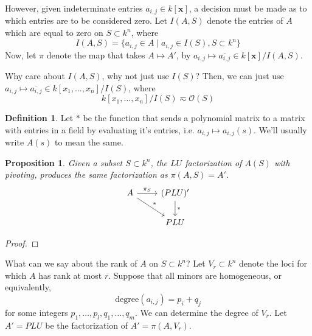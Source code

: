 \documentclass{amsart}
\newtheorem{proposition}[theorem]{Proposition}
\theoremstyle{definition}
\newtheorem{definition}[theorem]{Definition}
\theoremstyle{remark}
\numberwithin{equation}{section}
\begin{document}
However, given indeterminate entries $a_{i,j} \in k[\mathbf{x}]$, a decision must be made as to which entries are to be considered zero. Let $I(A, S)$ denote the entries of $A$ which are equal to zero on $S \subset k^n$, where
\begin{equation*}
  I(A, S) = \{ a_{i,j} \in A \mid a_{i,j} \in I(S), S \subset k^n \}
\end{equation*}
Now, let $\pi$ denote the map that takes $A \mapsto A'$, by $a_{i,j} \mapsto \overline{a_{i,j}} \in k[\mathbf{x}]/I(A, S)$.
\begin{aroundtodo}[caption={}]
  Why care about $I(A, S)$, why not just use $I(S)$? Then, we can just use $a_{i,j} \mapsto \overline{a_{i,j}} \in k[x_1, \ldots, x_n]/I(S)$, where
  \begin{equation*}
    k[x_1, \ldots, x_n]/I(S) \eqsim \mathcal{O}(S)
  \end{equation*}
\end{aroundtodo}

\begin{definition}
  Let $*$ be the function that sends a polynomial matrix to a matrix with entries in a field by evaluating it's entries, i.e. $a_{i,j} \mapsto a_{i,j}(s)$. We'll usually write $A(s)$ to mean the same.
\end{definition}

\begin{proposition}
  Given a subset $S \subset k^n$, the $LU$ factorization of $A(S)$ with pivoting, produces the same factorization as $\pi(A, S) = A'$.
  \begin{equation*}
    \begin{tikzcd}
      A \arrow[dr]{}{*} \arrow[r]{}{\pi_S} & \arrow[d]{}{*} (PLU)'\\
      & PLU
    \end{tikzcd}
  \end{equation*}
\end{proposition}

\begin{proof}
\end{proof}

What can we say about the rank of $A$ on $S \subset k^n$? Let $V_r \subset k^n$ denote the loci for which $A$ has rank at most $r$. Suppose that all minors are homogeneous, or equivalently,
\begin{equation*}
  \mathrm{degree}(a_{i,j}) = p_i + q_j
\end{equation*}
for some integers $p_1, \ldots, p_l, q_1, \ldots, q_m$.  We can determine the degree of $V_r$. Let $A' = PLU$ be the factorization of $A' = \pi(A, V_r)$.
\end{document}
